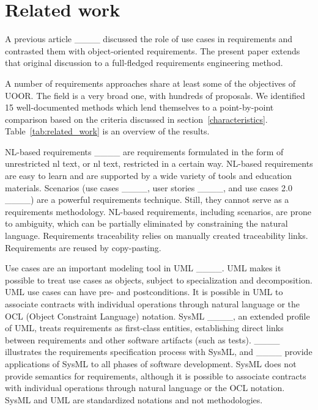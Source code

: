 \section{Related work}
\label{approaches}
A previous article ____ discussed the role of use cases
in requirements and contrasted them with object-oriented requirements. The present paper extends that original discussion to a full-fledged requirements engineering method. 

A number of requirements approaches share at least some of the objectives of UOOR. The field is a very broad one, with hundreds of proposals. We identified 15 well-documented methods which lend themselves to a point-by-point comparison based on the criteria discussed in section~\ref{characteristics}. Table~\ref{tab:related_work} is an overview of the results.



NL-based requirements ____ are requirements formulated in the form of unrestricted \acrshort{nl} text, or \acrshort{nl} text, restricted in a certain way. NL-based requirements are easy to learn and are supported by a wide variety of tools and education materials. Scenarios (use cases ____, user stories ____, and use cases 2.0 ____) are a powerful requirements technique. Still, they cannot serve as a requirements methodology. NL-based requirements, including scenarios, are prone to ambiguity, which can be partially eliminated by constraining the natural language. Requirements traceability relies on manually created traceability links. Requirements are reused by copy-pasting.

Use cases are an important modeling tool in UML ____. UML makes it possible to treat use cases as objects, subject to specialization and decomposition. UML use cases can have pre- and postconditions. It is possible in UML to associate contracts with individual operations through  natural language or the OCL (Object Constraint Language) notation. SysML ____, an extended profile of UML, treats requirements as first-class entities, establishing direct links between requirements and other software artifacts (such as tests). ____ illustrates the requirements specification process with SysML, and ____ provide applications of SysML to all phases of software development. SysML does not provide semantics for requirements, although it is possible to associate contracts with individual operations through natural language or the OCL notation. SysML and UML are standardized notations and not methodologies. 

